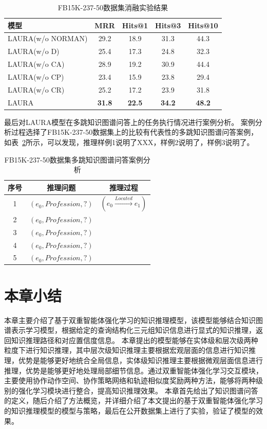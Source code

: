 \documentclass[algorithmlist, AutoFakeBold, AutoFakeSlant, figurelist, tablelist, nomlist, masters]{seuthesix}
\begin{document}
\begin{table}[]
  \centering
  \begin{tabular*}{0.95\textwidth}{@{\extracolsep{\fill}}lcccc}
  \toprule[1pt]
  模型 & MRR & Hits@1 & Hits@3 & Hits@10 \\ \hline
  LAURA(w/o NORMAN) & 29.2 & 18.9 & 31.3 & 44.3 \\
  LAURA(w/o D) & 25.4 & 17.3 & 24.8 & 32.3 \\
  LAURA(w/o CA) & 28.9 & 19.2 & 30.9 & 44.4 \\
  LAURA(w/o CP) & 23.4 & 15.9 & 23.8 & 29.4 \\
  LAURA(w/o CR) & 25.2 & 17.2 & 23.9 & 31.8 \\
  LAURA & \textbf{31.8} & \textbf{22.5} & \textbf{34.2} & \textbf{48.2} \\
  \bottomrule[1pt]
  \end{tabular*}
  \caption{FB15K-237-50数据集消融实验结果}
  \label{Experiment2_ablation}
\end{table}

最后对LAURA模型在多跳知识图谱问答上的任务执行情况进行案例分析。
案例分析过程选择了FB15K-237-50数据集上的比较有代表性的多跳知识图谱问答案例，如表~\ref{Experiment2_CaseStudy}所示，可以发现，推理样例1说明了XXX，样例2说明了，样例3说明了。
\begin{table}[]
  \centering
  \begin{tabular*}{0.95\textwidth}{@{\extracolsep{\fill}}ccc}
  \toprule[1pt]
  序号 & 推理问题 & 推理过程 \\ \hline
  1 & $(e_0, Profession, ?)$ & $(e_0 \stackrel{Located}{\longrightarrow} e_1)$ \\
  2 & $(e_0, Profession, ?)$ &  \\
  3 & $(e_0, Profession, ?)$ &  \\
  4 & $(e_0, Profession, ?)$ &  \\
  5 & $(e_0, Profession, ?)$ &  \\
  \bottomrule[1pt]
  \end{tabular*}
  \caption{FB15K-237-50数据集多跳知识图谱问答案例分析}
  \label{Experiment2_CaseStudy}
\end{table}

\section{本章小结}
本章主要介绍了基于双重智能体强化学习的知识推理模型，该模型能够结合知识图谱表示学习模型，根据给定的查询结构化三元组知识信息进行显式的知识推理，返回知识推理路径和对应置信度信息。
本章提出的模型能够在实体级和层次级两种粒度下进行知识推理，其中层次级知识推理主要根据宏观层面的信息进行知识推理，优势是能够更好地统合全局信息，实体级知识推理主要根据微观层面信息进行推理，优势是能够更好地处理局部细节信息。通过双重智能体强化学习交互模块，主要使用协作动作空间、协作策略网络和轨迹相似度奖励两种方法，能够将两种级别的强化学习模块进行整合，提高知识推理效果。
本章首先给出了知识图谱问答的定义，随后介绍了方法概览，并详细介绍了本文提出的基于双重智能体强化学习的知识推理模型的模型与策略，最后在公开数据集上进行了实验，验证了模型的效果。
\end{document}
